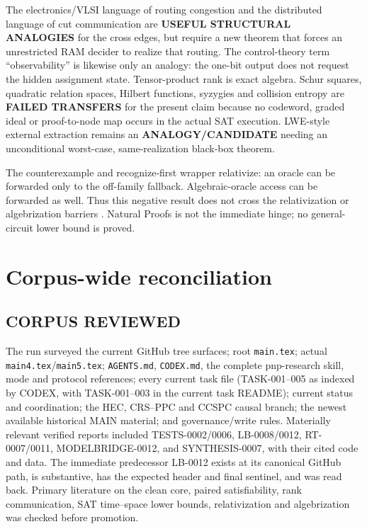 \documentclass[11pt]{article}
\begin{document}
The electronics/VLSI language of routing congestion and the distributed
language of cut communication are \textbf{USEFUL STRUCTURAL ANALOGIES} for
the cross edges, but require a new theorem that forces an unrestricted RAM
decider to realize that routing.  The control-theory term ``observability''
is likewise only an analogy: the one-bit output does not request the hidden
assignment state.  Tensor-product rank is exact algebra.  Schur squares,
quadratic relation spaces, Hilbert functions, syzygies and collision entropy
are \textbf{FAILED TRANSFERS} for the present claim because no codeword,
graded ideal or proof-to-node map occurs in the actual SAT execution.
LWE-style external extraction remains an \textbf{ANALOGY/CANDIDATE} needing
an unconditional worst-case, same-realization black-box theorem.

The counterexample and recognize-first wrapper relativize: an oracle can be
forwarded only to the off-family fallback.  Algebraic-oracle access can be
forwarded as well.  Thus this negative result does not cross the
relativization or algebrization barriers \cite{bgs,aw}.  Natural Proofs is
not the immediate hinge; no general-circuit lower bound is proved.

\section{Corpus-wide reconciliation}

\subsection*{CORPUS REVIEWED}
The run surveyed the current GitHub tree surfaces; root \texttt{main.tex};
actual \texttt{main4.tex}/\texttt{main5.tex}; \texttt{AGENTS.md},
\texttt{CODEX.md}, the complete pnp-research skill, mode and protocol
references; every current task file (TASK-001--005 as indexed by CODEX, with
TASK-001--003 in the current task README); current status and coordination;
the HEC, CRS--PPC and CCSPC causal branch; the newest available historical
MAIN material; and governance/write rules.  Materially relevant verified
reports included TESTS-0002/0006, LB-0008/0012, RT-0007/0011,
MODELBRIDGE-0012, and SYNTHESIS-0007, with their cited code and data.
The immediate predecessor LB-0012 exists at its canonical GitHub path, is
substantive, has the expected header and final sentinel, and was read back.
Primary literature on the clean core, paired satisfiability, rank
communication, SAT time--space lower bounds, relativization and
algebrization was checked before promotion.
\end{document}
